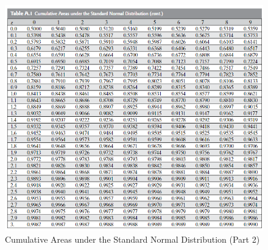 \documentclass[12pt]{article}
\begin{document}
\begin{figure}[ht]
  \centering
  \includegraphics[width=\textwidth]{images/z-table_2.png}
  \caption{Cumulative Areas under the Standard Normal Distribution (Part 2)}
\end{figure}
\end{document}
